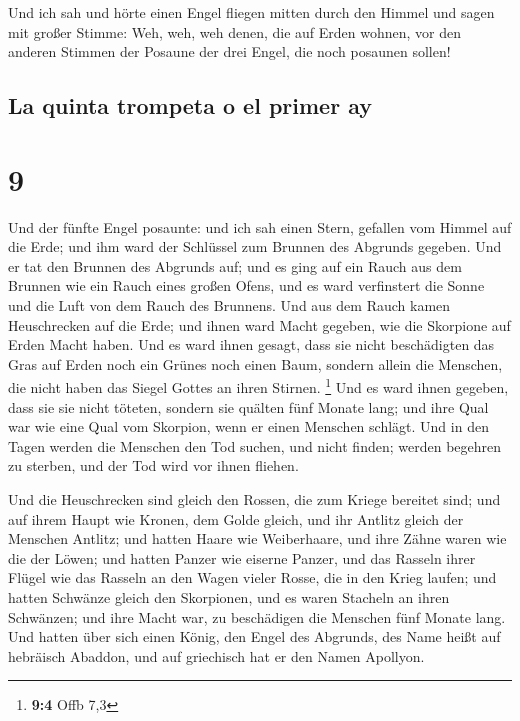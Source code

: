  Und ich sah und hörte einen Engel fliegen mitten durch
den Himmel und sagen mit großer Stimme: Weh, weh, weh denen, die auf
Erden wohnen, vor den anderen Stimmen der Posaune der drei Engel, die
noch posaunen sollen!

\hypertarget{la-quinta-trompeta-o-el-primer-ay}{%
\subsection{La quinta trompeta o el primer
ay}\label{la-quinta-trompeta-o-el-primer-ay}}

\hypertarget{section-8}{%
\section{9}\label{section-8}}

 Und der fünfte Engel posaunte: und ich sah einen Stern,
gefallen vom Himmel auf die Erde; und ihm ward der Schlüssel zum Brunnen
des Abgrunds gegeben.  Und er tat den Brunnen des Abgrunds
auf; und es ging auf ein Rauch aus dem Brunnen wie ein Rauch eines
großen Ofens, und es ward verfinstert die Sonne und die Luft von dem
Rauch des Brunnens.  Und aus dem Rauch kamen Heuschrecken
auf die Erde; und ihnen ward Macht gegeben, wie die Skorpione auf Erden
Macht haben.  Und es ward ihnen gesagt, dass sie nicht
beschädigten das Gras auf Erden noch ein Grünes noch einen Baum, sondern
allein die Menschen, die nicht haben das Siegel Gottes an ihren Stirnen.
\footnote{\textbf{9:4} Offb 7,3}  Und es ward ihnen
gegeben, dass sie sie nicht töteten, sondern sie quälten fünf Monate
lang; und ihre Qual war wie eine Qual vom Skorpion, wenn er einen
Menschen schlägt.  Und in den Tagen werden die Menschen
den Tod suchen, und nicht finden; werden begehren zu sterben, und der
Tod wird vor ihnen fliehen.

 Und die Heuschrecken sind gleich den Rossen, die zum
Kriege bereitet sind; und auf ihrem Haupt wie Kronen, dem Golde gleich,
und ihr Antlitz gleich der Menschen Antlitz;  und hatten
Haare wie Weiberhaare, und ihre Zähne waren wie die der Löwen;
 und hatten Panzer wie eiserne Panzer, und das Rasseln
ihrer Flügel wie das Rasseln an den Wagen vieler Rosse, die in den Krieg
laufen;  und hatten Schwänze gleich den Skorpionen, und
es waren Stacheln an ihren Schwänzen; und ihre Macht war, zu beschädigen
die Menschen fünf Monate lang.  Und hatten über sich
einen König, den Engel des Abgrunds, des Name heißt auf hebräisch
Abaddon, und auf griechisch hat er den Namen Apollyon.


